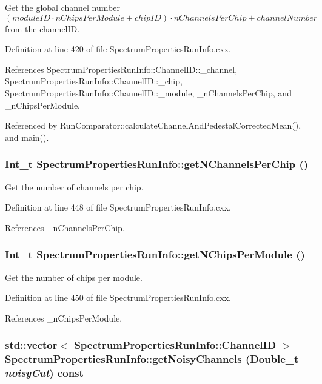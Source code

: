 Get the global channel number $( moduleID \cdot nChipsPerModule + chipID ) \cdot nChannelsPerChip + channelNumber $ from the channelID. 

Definition at line 420 of file SpectrumPropertiesRunInfo.cxx.

References SpectrumPropertiesRunInfo::ChannelID::\_\-channel, SpectrumPropertiesRunInfo::ChannelID::\_\-chip, SpectrumPropertiesRunInfo::ChannelID::\_\-module, \_\-nChannelsPerChip, and \_\-nChipsPerModule.

Referenced by RunComparator::calculateChannelAndPedestalCorrectedMean(), and main().\hypertarget{class_spectrum_properties_run_info_a3d9d8e0ae2cef40794561409120e257c}{
\subsubsection[{getNChannelsPerChip}]{\setlength{\rightskip}{0pt plus 5cm}Int\_\-t SpectrumPropertiesRunInfo::getNChannelsPerChip ()}}
\label{class_spectrum_properties_run_info_a3d9d8e0ae2cef40794561409120e257c}


Get the number of channels per chip. 

Definition at line 448 of file SpectrumPropertiesRunInfo.cxx.

References \_\-nChannelsPerChip.\hypertarget{class_spectrum_properties_run_info_aaac273064e2d136ef58e589c677aec94}{
\subsubsection[{getNChipsPerModule}]{\setlength{\rightskip}{0pt plus 5cm}Int\_\-t SpectrumPropertiesRunInfo::getNChipsPerModule ()}}
\label{class_spectrum_properties_run_info_aaac273064e2d136ef58e589c677aec94}


Get the number of chips per module. 

Definition at line 450 of file SpectrumPropertiesRunInfo.cxx.

References \_\-nChipsPerModule.\hypertarget{class_spectrum_properties_run_info_a224a09a5da8dd40b3b368ce11811a816}{
\subsubsection[{getNoisyChannels}]{\setlength{\rightskip}{0pt plus 5cm}std::vector$<$ {\bf SpectrumPropertiesRunInfo::ChannelID} $>$ SpectrumPropertiesRunInfo::getNoisyChannels (Double\_\-t {\em noisyCut}) const}}
\label{class_spectrum_properties_run_info_a224a09a5da8dd40b3b368ce11811a816}


